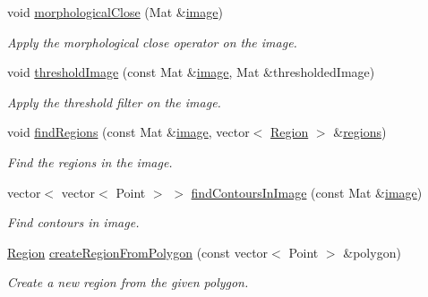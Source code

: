 \begin{DoxyCompactItemize}
void \hyperlink{classmultiscale_1_1analysis_1_1RegionDetector_adcb8ab3ced63de9168734f0b24072705}{morphological\-Close} (Mat \&\hyperlink{classmultiscale_1_1analysis_1_1Detector_a523830a6cfe409694ce8327c3c736fbd}{image})
\begin{DoxyCompactList}\small\item\em Apply the morphological close operator on the image. \end{DoxyCompactList}\item 
void \hyperlink{classmultiscale_1_1analysis_1_1RegionDetector_a614cd80fac5d3df2a25c401bb221149c}{threshold\-Image} (const Mat \&\hyperlink{classmultiscale_1_1analysis_1_1Detector_a523830a6cfe409694ce8327c3c736fbd}{image}, Mat \&thresholded\-Image)
\begin{DoxyCompactList}\small\item\em Apply the threshold filter on the image. \end{DoxyCompactList}\item 
void \hyperlink{classmultiscale_1_1analysis_1_1RegionDetector_a886ec5ee1cd2fd816c1cfd4e2ea6778e}{find\-Regions} (const Mat \&\hyperlink{classmultiscale_1_1analysis_1_1Detector_a523830a6cfe409694ce8327c3c736fbd}{image}, vector$<$ \hyperlink{classmultiscale_1_1analysis_1_1Region}{Region} $>$ \&\hyperlink{classmultiscale_1_1analysis_1_1RegionDetector_aa6517ceb3a58295448d32e6e41499893}{regions})
\begin{DoxyCompactList}\small\item\em Find the regions in the image. \end{DoxyCompactList}\item 
vector$<$ vector$<$ Point $>$ $>$ \hyperlink{classmultiscale_1_1analysis_1_1RegionDetector_a19918b5cd0ec310ad6149c7345870b3f}{find\-Contours\-In\-Image} (const Mat \&\hyperlink{classmultiscale_1_1analysis_1_1Detector_a523830a6cfe409694ce8327c3c736fbd}{image})
\begin{DoxyCompactList}\small\item\em Find contours in image. \end{DoxyCompactList}\item 
\hyperlink{classmultiscale_1_1analysis_1_1Region}{Region} \hyperlink{classmultiscale_1_1analysis_1_1RegionDetector_a1416b365f921e02e5161d72b0b69f287}{create\-Region\-From\-Polygon} (const vector$<$ Point $>$ \&polygon)
\begin{DoxyCompactList}\small\item\em Create a new region from the given polygon. \end{DoxyCompactList}\item 

\end{DoxyCompactItemize}
